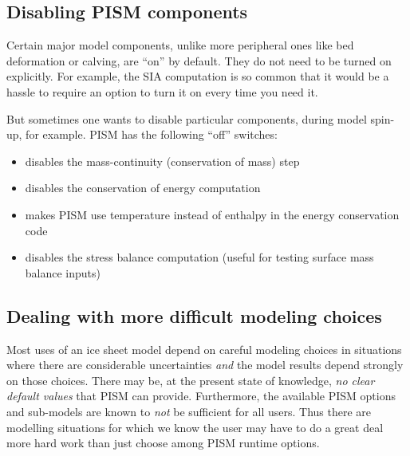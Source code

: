 \subsection{Disabling PISM components}
\label{sec:turning-off}

Certain major model components, unlike more peripheral ones like bed deformation or calving, are ``on'' by default.  They do not need to be turned on explicitly.  For example, the SIA computation is so common that it would be a hassle to require an option to turn it on every time you need it.

But sometimes one wants to disable particular components, during model spin-up, for example.  PISM has the following ``off'' switches:
\begin{itemize}
\item {} disables the mass-continuity (conservation of mass) step
\item {} disables the conservation of energy computation
\item {} makes PISM use temperature instead of enthalpy in the energy conservation code
\item {} disables the stress balance computation (useful for testing surface mass balance inputs)
\end{itemize}


\subsection{Dealing with more difficult modeling choices}
\label{subsec:hard-choices}

Most uses of an ice sheet model depend on careful modeling choices in situations where there are considerable uncertainties \emph{and} the model results depend strongly on those choices.  There may be, at the present state of knowledge, \emph{no clear default values} that PISM can provide.  Furthermore, the available PISM options and sub-models are known to \emph{not} be sufficient for all users.  Thus there are modelling situations for which we know the user may have to do a great deal more hard work than just choose among PISM runtime options.

